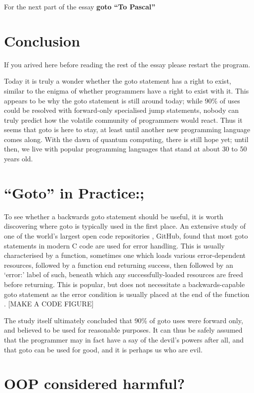 \documentclass{journal}
\begin{document}
For the next part of the essay \textbf{goto ``To Pascal''}

\section{Conclusion}
If you arived here before reading the rest of the essay please restart the program.

Today it is truly a wonder whether the goto statement has a right to exist, similar to the enigma of whether programmers have a right to exist with it. This appears to be why the goto statement is still around today; while 90\% of uses could be resolved with forward-only specialised jump statements, nobody can truly predict how the volatile community of programmers would react. Thus it seems that goto is here to stay, at least until another new programming language comes along. With the dawn of quantum computing, there is still hope yet; until then, we live with popular programming languages that stand at about 30 to 50 years old.

\section{``Goto'' in Practice:;}
To see whether a backwards goto statement should be useful, it is worth discovering where goto is typically used in the first place. An extensive study \cite{gotostudy} of one of the world's largest open code repositories \cite{github}, GitHub, found that most goto statements in modern C code are used for error handling. This is usually characterised by a function, sometimes one which loads various error-dependent resources, followed by a function end returning success, then followed by an `error:' label of such, beneath which any successfully-loaded resources are freed before returning. This is popular, but does not necessitate a backwards-capable goto statement as the error condition is usually placed at the end of the function \cite{gotostudy}. [MAKE A CODE FIGURE]

The study itself ultimately concluded that 90\% of goto uses were forward only, and believed to be used for reasonable purposes. It can thus be safely assumed that the programmer may in fact have a say of the devil's powers after all, and that goto can be used for good, and it is perhaps us who are evil.



\section{OOP considered harmful?}
\end{document}
